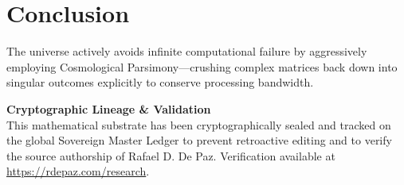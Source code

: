 \documentclass[12pt, a4paper]{article}
\theoremstyle{plain}
\theoremstyle{definition}
\begin{document}
\section{Conclusion}
The universe actively avoids infinite computational failure by aggressively employing Cosmological Parsimony—crushing complex matrices back down into singular outcomes explicitly to conserve processing bandwidth.




\vspace{3em}
\noindent\hrulefill

\noindent\textbf{Cryptographic Lineage \& Validation}\\
This mathematical substrate has been cryptographically sealed and tracked on the global Sovereign Master Ledger to prevent retroactive editing and to verify the source authorship of Rafael D. De Paz. Verification available at \url{https://rdepaz.com/research}.
\end{document}

